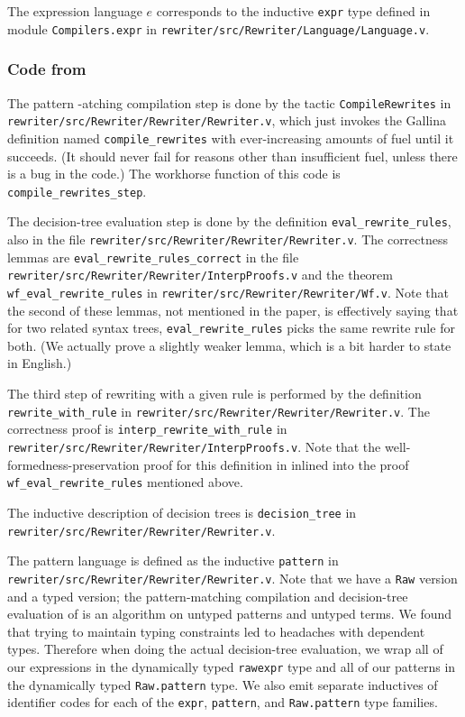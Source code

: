 \begin{subappendices}
The expression language $e$ corresponds to the inductive \texttt{expr} type defined in module \texttt{Compilers.expr} in \texttt{rewriter/src/Rewriter/Language/Language.v}.

\subsubsection{Code from }

The pattern -atching compilation step is done by the tactic \texttt{CompileRewrites} in \texttt{rewriter/src/Rewriter/Rewriter/Rewriter.v}, which just invokes the Gallina definition named \texttt{compile\_rewrites} with ever-increasing amounts of fuel until it succeeds.
(It should never fail for reasons other than insufficient fuel, unless there is a bug in the code.)
The workhorse function of this code is \texttt{compile\_rewrites\_step}.

The decision-tree evaluation step is done by the definition \texttt{eval\_rewrite\_rules}, also in the file \texttt{rewriter/src/Rewriter/Rewriter/Rewriter.v}.
The correctness lemmas are \texttt{eval\_rewrite\_rules\_correct} in the file \texttt{rewriter/src/Rewriter/Rewriter/InterpProofs.v} and the theorem \texttt{wf\_eval\_rewrite\_rules} in \texttt{rewriter/src/Rewriter/Rewriter/Wf.v}.
Note that the second of these lemmas, not mentioned in the paper, is effectively saying that for two related syntax trees, \texttt{eval\_rewrite\_rules} picks the same rewrite rule for both.
(We actually prove a slightly weaker lemma, which is a bit harder to state in English.)

The third step of rewriting with a given rule is performed by the definition \texttt{rewrite\_with\_rule} in \texttt{rewriter/src/Rewriter/Rewriter/Rewriter.v}.
The correctness proof is \texttt{interp\_rewrite\_with\_rule} in \texttt{rewriter/src/Rewriter/Rewriter/InterpProofs.v}.
Note that the well-formedness-preservation proof for this definition in inlined into the proof \verb|wf_eval_rewrite_rules| mentioned above.

The inductive description of decision trees is \verb|decision_tree| in \texttt{rewriter/src/Rewriter/Rewriter/Rewriter.v}.

The pattern language is defined as the inductive \verb|pattern| in \texttt{rewriter/src/Rewriter/Rewriter/Rewriter.v}.
Note that we have a \verb|Raw| version and a typed version; the pattern-matching compilation and decision-tree evaluation of \textcite{Aehlig} is an algorithm on untyped patterns and untyped terms.
We found that trying to maintain typing constraints led to headaches with dependent types.
Therefore when doing the actual decision-tree evaluation, we wrap all of our expressions in the dynamically typed \verb|rawexpr| type and all of our patterns in the dynamically typed \verb|Raw.pattern| type.
We also emit separate inductives of identifier codes for each of the \verb|expr|, \verb|pattern|, and \verb|Raw.pattern| type families.


\end{subappendices}
